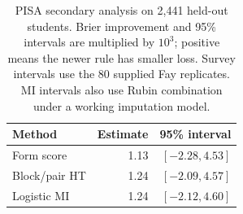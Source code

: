 \begin{table}[t]
\centering
\caption{PISA secondary analysis on 2,441 held-out students. Brier improvement and 95\% intervals are multiplied by $10^3$; positive means the newer rule has smaller loss. Survey intervals use the 80 supplied Fay replicates. MI intervals also use Rubin combination under a working imputation model.}
\label{tab:pisa}
\small
\begin{tabular}{lrr}
\toprule
Method & Estimate & 95\% interval \\
\midrule
Form score & 1.13 & $[-2.28, 4.53]$ \\
Block/pair HT & 1.24 & $[-2.09, 4.57]$ \\
Logistic MI & 1.24 & $[-2.12, 4.60]$ \\
\bottomrule
\end{tabular}
\end{table}
